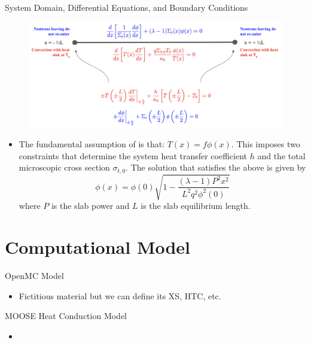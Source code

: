 \documentclass[9pt,t]{beamer}
\begin{document}
\begin{frame}{System Domain, Differential Equations, and Boundary Conditions}
    \begin{figure}[H]
        \centering
        \includegraphics[width=0.775\linewidth]{figures/1D_Benchmark_Diagram.png}
    \end{figure}
    \begin{itemize}
        \item The fundamental assumption of \cite{analytical-benchmark} is that: $T(x)=f\phi(x)$. This imposes
        two constraints that determine the system heat transfer coefficient $h$ and the total microscopic
        cross section $\sigma_{t,0}$. The solution that satisfies the above is given by
        \begin{equation}
            \phi(x) = \phi(0) \sqrt{1 - \frac{(\lambda - 1)P^{2}x^{2}}{L^{2}q^{2}\phi^2(0)}}
        \end{equation}
        where $P$ is the slab power and $L$ is the slab equilibrium length.
    \end{itemize}
\end{frame}

\section{Computational Model}
\begin{frame}{OpenMC Model}
    \begin{itemize}
        \item Fictitious material but we can define its XS, HTC, etc.
    \end{itemize}
\end{frame}

\begin{frame}{MOOSE Heat Conduction Model}
    \begin{itemize}
        \item
    \end{itemize}
\end{frame}
\end{document}
